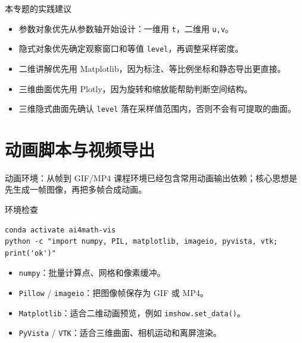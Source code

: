 \documentclass[aspectratio=169,11pt]{ctexbeamer}
\begin{document}
\begin{frame}{本专题的实践建议}
  \begin{itemize}
    \item 参数对象优先从参数轴开始设计：一维用 \texttt{t}，二维用 \texttt{u,v}。
    \item 隐式对象优先确定观察窗口和等值 \texttt{level}，再调整采样密度。
    \item 二维讲解优先用 Matplotlib，因为标注、等比例坐标和静态导出更直接。
    \item 三维曲面优先用 Plotly，因为旋转和缩放能帮助判断空间结构。
    \item 三维隐式曲面先确认 \texttt{level} 落在采样值范围内，否则不会有可提取的曲面。
  \end{itemize}
\end{frame}

\section{动画脚本与视频导出}

\begin{frame}[fragile]{动画环境：从帧到 GIF/MP4}
  课程环境已经包含常用动画输出依赖；核心思想是先生成一帧图像，再把多帧合成动画。

  \begin{block}{环境检查}
\begin{Verbatim}[fontsize=\small]
conda activate ai4math-vis
python -c "import numpy, PIL, matplotlib, imageio, pyvista, vtk; print('ok')"
\end{Verbatim}
  \end{block}

  \begin{itemize}
    \item \texttt{numpy}：批量计算点、网格和像素缓冲。
    \item \texttt{Pillow} / \texttt{imageio}：把图像帧保存为 GIF 或 MP4。
    \item \texttt{Matplotlib}：适合二维动画预览，例如 \texttt{imshow.set\_data()}。
    \item \texttt{PyVista} / \texttt{VTK}：适合三维曲面、相机运动和离屏渲染。
  \end{itemize}
\end{frame}
\end{document}
